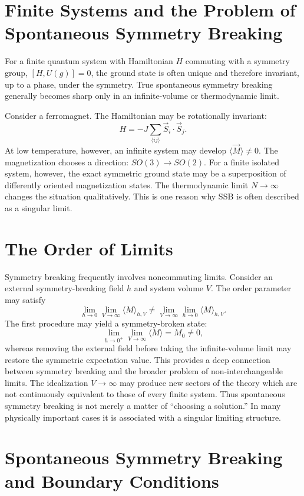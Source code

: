 \section{Finite Systems and the Problem of Spontaneous Symmetry Breaking}
\label{sp:ssb3}

For a finite quantum system with Hamiltonian $H$ commuting with a symmetry group,
$[H,U(g)]=0$,
the ground state is often unique and therefore invariant, up to a phase, under
the symmetry.
True spontaneous symmetry breaking generally becomes sharp only in an
infinite-volume or thermodynamic limit.

Consider a ferromagnet. The Hamiltonian may be rotationally invariant:
\[H=-J\sum_{\langle ij\rangle}\vec{S}_i\cdot\vec{S}_j.\]
At low temperature, however, an infinite system may develop
$\langle\vec{M}\rangle\neq0$.
The magnetization chooses a direction:
$SO(3)\rightarrow SO(2)$.
For a finite isolated system, however, the exact symmetric ground state may be
a superposition of differently oriented magnetization states.
The thermodynamic limit $N\rightarrow\infty$ changes the situation qualitatively.
This is one reason why SSB is often described as a singular limit.

\section{ The Order of Limits}
\label{sp:ssb4}

Symmetry breaking frequently involves noncommuting limits.
Consider an external symmetry-breaking field $h$ and system volume $V$.
The order parameter may satisfy
\[\lim_{h\rightarrow0}\lim_{V\rightarrow\infty}\langle M\rangle_{h,V}
\neq\lim_{V\rightarrow\infty}\lim_{h\rightarrow0}\langle M\rangle_{h,V}.\]
The first procedure may yield a symmetry-broken state:
\[\lim_{h\to0^+}\lim_{V\to\infty}\langle M\rangle=M_0\neq0,\]
whereas removing the external field before taking the infinite-volume limit may
restore the symmetric expectation value.
This provides a deep connection between symmetry breaking and the broader
problem of non-interchangeable limits.
The idealization $V\rightarrow\infty$
may produce new sectors of the theory which are not continuously equivalent 
to those of every finite system.
Thus spontaneous symmetry breaking is not merely a matter of ``choosing a solution.''
In many physically important cases it is associated with a singular 
limiting structure.

\section{ Spontaneous Symmetry Breaking and Boundary Conditions}
\label{sp:ssb5}


